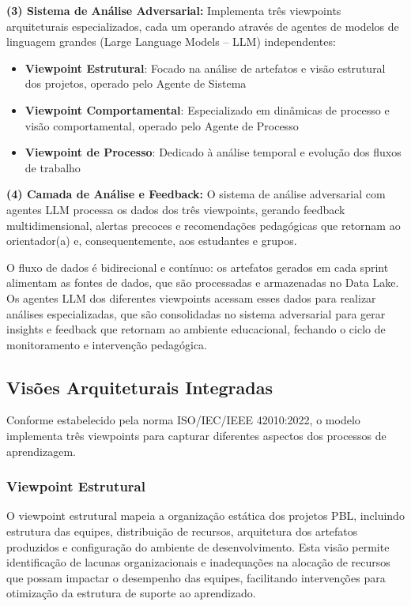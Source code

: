 \documentclass[english, spanish, brazilian]{modelo_dt}
\begin{document}
\textbf{(3) Sistema de Análise Adversarial:} Implementa três viewpoints arquiteturais especializados, cada um operando através de agentes de modelos de linguagem grandes (Large Language Models -- LLM) independentes:
\begin{itemize}
\item \textbf{Viewpoint Estrutural}: Focado na análise de artefatos e visão estrutural dos projetos, operado pelo Agente de Sistema
\item \textbf{Viewpoint Comportamental}: Especializado em dinâmicas de processo e visão comportamental, operado pelo Agente de Processo
\item \textbf{Viewpoint de Processo}: Dedicado à análise temporal e evolução dos fluxos de trabalho
\end{itemize}

\textbf{(4) Camada de Análise e Feedback:} O sistema de análise adversarial com agentes LLM processa os dados dos três viewpoints, gerando feedback multidimensional, alertas precoces e recomendações pedagógicas que retornam ao orientador(a) e, consequentemente, aos estudantes e grupos\@.

O fluxo de dados é bidirecional e contínuo: os artefatos gerados em cada sprint alimentam as fontes de dados, que são processadas e armazenadas no Data Lake. Os agentes LLM dos diferentes viewpoints acessam esses dados para realizar análises especializadas, que são consolidadas no sistema adversarial para gerar insights e feedback que retornam ao ambiente educacional, fechando o ciclo de monitoramento e intervenção pedagógica\@.

\subsection{Visões Arquiteturais Integradas}

Conforme estabelecido pela norma ISO/IEC/IEEE 42010:2022, o modelo implementa três viewpoints para capturar diferentes aspectos dos processos de aprendizagem\@.

\subsubsection{Viewpoint Estrutural}

O viewpoint estrutural mapeia a organização estática dos projetos PBL, incluindo estrutura das equipes, distribuição de recursos, arquitetura dos artefatos produzidos e configuração do ambiente de desenvolvimento\@. Esta visão permite identificação de lacunas organizacionais e inadequações na alocação de recursos que possam impactar o desempenho das equipes, facilitando intervenções para otimização da estrutura de suporte ao aprendizado\@.
\end{document}
